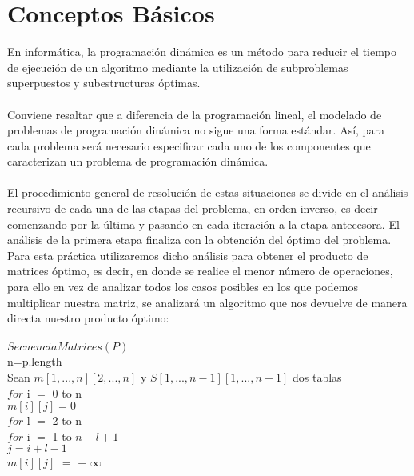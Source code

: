\documentclass[12pt,twoside]{article}
\begin{document}
\section{Conceptos B\'asicos}
En inform\'atica, la programaci\'on din\'amica es un m\'etodo para reducir el tiempo de ejecuci\'on de un algoritmo mediante la utilizaci\'on de subproblemas superpuestos y subestructuras \'optimas.\\\\
Conviene resaltar que a diferencia de la programaci\'on lineal, el modelado de problemas de programaci\'on din\'amica no sigue una forma est\'andar. As\'i, para cada problema ser\'a necesario especificar cada uno de los componentes que caracterizan un problema de programaci\'on din\'amica.\\\\
El procedimiento general de resoluci\'on de estas situaciones se divide en el an\'alisis recursivo de cada una de las etapas del problema, en orden inverso, es decir comenzando por la \'ultima y pasando en cada iteraci\'on a la etapa antecesora. El an\'alisis de la primera etapa finaliza con la obtenci\'on del \'optimo del problema. Para esta pr\'actica utilizaremos dicho an\'alisis para obtener el producto de matrices \'optimo, es decir, en donde se realice el menor n\'umero de operaciones, para ello en vez de analizar todos los casos posibles en los que podemos multiplicar nuestra matriz, se analizar\'a un algoritmo que nos devuelve de manera directa nuestro producto \'optimo:\\\\
\hspace*{1cm}$SecuenciaMatrices(P)$\\
\hspace*{1.5cm}n=p.length\\
\hspace*{1.5cm}Sean $m[1,...,n][2,...,n]$ y $S[1,...,n-1][1,...,n-1]$ dos tablas\\
\hspace*{1.5cm}$for$ i $=$ 0 to n\\
\hspace*{2cm}$m[i][j]=0$\\
\hspace*{1.5cm}$for$ l $=$ 2 to n\\
\hspace*{2cm}$for$ i $=$ 1 to $n-l+1$\\
\hspace*{2.5cm}$j=i+l-1$\\
\hspace*{2.5cm}$m[i][j]$ $=$ + $\infty$\\
\end{document}
